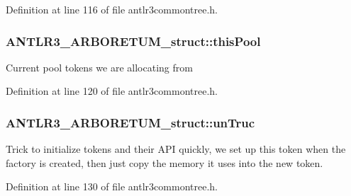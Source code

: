 Definition at line 116 of file antlr3commontree.\-h.

\hypertarget{struct_a_n_t_l_r3___a_r_b_o_r_e_t_u_m__struct_a19e4da052a80ecbc584efc6e868fb638}{
\subsubsection[{this\-Pool}]{ A\-N\-T\-L\-R3\-\_\-\-A\-R\-B\-O\-R\-E\-T\-U\-M\-\_\-struct\-::this\-Pool}}\label{struct_a_n_t_l_r3___a_r_b_o_r_e_t_u_m__struct_a19e4da052a80ecbc584efc6e868fb638}
Current pool tokens we are allocating from 

Definition at line 120 of file antlr3commontree.\-h.

\hypertarget{struct_a_n_t_l_r3___a_r_b_o_r_e_t_u_m__struct_a1be3818e6d2c0eca5135e6da9cdb63e7}{
\subsubsection[{un\-Truc}]{ A\-N\-T\-L\-R3\-\_\-\-A\-R\-B\-O\-R\-E\-T\-U\-M\-\_\-struct\-::un\-Truc}}\label{struct_a_n_t_l_r3___a_r_b_o_r_e_t_u_m__struct_a1be3818e6d2c0eca5135e6da9cdb63e7}
Trick to initialize tokens and their A\-P\-I quickly, we set up this token when the factory is created, then just copy the memory it uses into the new token. 

Definition at line 130 of file antlr3commontree.\-h.

